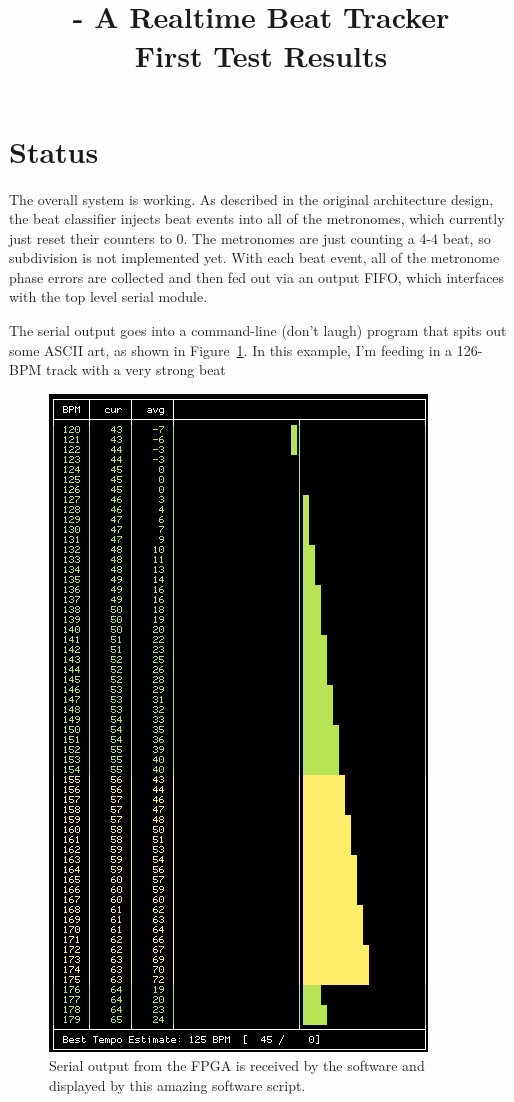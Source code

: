\documentclass[letterpaper]{article}
\title{\projname{} - A Realtime Beat Tracker \\ First Test Results}
\begin{document}
\maketitle

\section{Status}

The overall system is working.  As described in the original architecture
design, the beat classifier injects beat events into all of the metronomes,
which currently just reset their counters to 0.  The metronomes are just
counting a 4-4 beat, so subdivision is not implemented yet.  With each beat
event, all of the metronome phase errors are collected and then fed out via an
output FIFO, which interfaces with the top level serial module.

The serial output goes into a command-line (don't laugh) program that spits out
some ASCII art, as shown in Figure~\ref{fig:swscreenshot}.  In this example,
I'm feeding in a 126-BPM track with a very strong beat

    \begin{figure}
        \centering
        \includegraphics[scale=.3]{fig/swscreenshot.png}
        \caption{Serial output from the FPGA is received by the software and
            displayed by this amazing software script.}
        \label{fig:swscreenshot}
    \end{figure}
\end{document}
